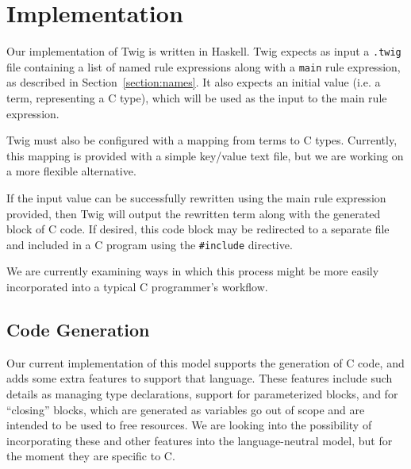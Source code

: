 
\section{Implementation}

Our implementation of Twig is written in Haskell. Twig expects as input a
\texttt{.twig} file containing a list of named rule expressions along with a
\texttt{main} rule expression, as described in Section~\ref{section:names}. It
also expects an initial value (i.e. a term, representing a C type), which will
be used as the input to the main rule expression.

Twig must also be configured with a mapping from terms to C types. Currently,
this mapping is provided with a simple key/value text file, but we are working
on a more flexible alternative.

If the input value can be successfully rewritten using the main rule
expression provided, then Twig will output the rewritten term along with the
generated block of C code. If desired, this code block may be redirected to a
separate file and included in a C program using the \texttt{\#include}
directive.

We are currently examining ways in which this process might be more easily
incorporated into a typical C programmer's workflow.

\subsection{Code Generation}

Our current implementation of this model supports the generation of C code, and
adds some extra features to support that language. These features include such
details as managing type declarations, support for parameterized blocks, and for
``closing'' blocks, which are generated as variables go out of scope and are
intended to be used to free resources. We are looking into the possibility of
incorporating these and other features into the language-neutral model, but for
the moment they are specific to C.
